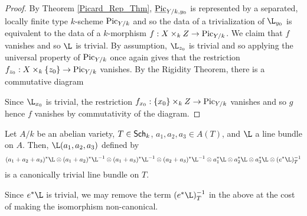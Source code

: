 \documentclass[11pt]{article}
\begin{document}
\begin{proof}
By Theorem \ref{Picard_Rep_Thm}, $\underline{\operatorname{Pic}}_{Y/k,y_0}$ is represented by a separated, locally finite type $k$-scheme $\operatorname{Pic}_{Y/k}$ and so the data of a trivialization of $\L_{y_0}$ is equivalent to the data of a $k$-morphism $f: X\times_kZ\to\operatorname{Pic}_{Y/k}$. We claim that $f$ vanishes and so $\L$ is trivial. By assumption, $\L_{z_0}$ is trivial and so applying the universal property of $\operatorname{Pic}_{Y/k}$ once again gives that the restriction $f_{z_0}: X\times_k\{z_0\}\to\operatorname{Pic}_{Y/k}$ vanishes. By the Rigidity Theorem, there is a commutative diagram 
\begin{center}
\end{center}
Since $\L_{x_0}$ is trivial, the restriction $f_{x_0}: \{x_0\}\times_kZ\to\operatorname{Pic}_{Y/k}$ vanishes and so $g$ hence $f$ vanishes by commutativity of the diagram. 
\end{proof}

\begin{corollary}\label{adding_rational_points}
Let $A/k$ be an abelian variety, $T\in\operatorname{\mathsf{Sch}}_k$, $a_1,a_2,a_3\in A(T)$, and $\L$ a line bundle on $A$. Then, $\L(a_1,a_2,a_3)$ defined by
\begin{equation*}
(a_1+a_2+a_3)^*\L
\tensor(a_1+a_2)^*\L^{-1}\tensor(a_1+a_3)^*\L^{-1}\tensor(a_2+a_3)^*\L^{-1}
\tensor a_1^*\L\tensor a_2^*\L\tensor a_3^*\L
\tensor(e^*\L)_T^{-1}
\end{equation*}
is a canonically trivial line bundle on $T$.
\end{corollary}

\begin{remark}
Since $e^*\L$ is trivial, we may remove the term $(e^*\L)_T^{-1}$ in the above at the cost of making the isomorphism non-canonical.
\end{remark}
\end{document}

